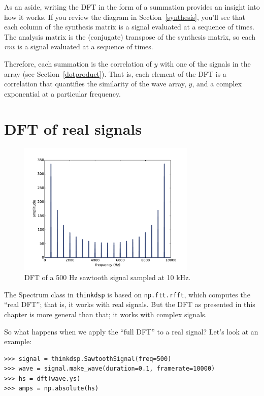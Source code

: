 \documentclass[12pt]{book}
\begin{document}
As an aside, writing the DFT in the form of a summation provides an
insight into how it works.  If you review the diagram in
Section~\ref{synthesis}, you'll see that each column of the synthesis matrix
is a signal evaluated at a sequence of times.  The analysis matrix is
the (conjugate) transpose of the synthesis matrix, so each {\em row}
is a signal evaluated at a sequence of times.

Therefore, each summation is the correlation of $y$ with one of the
signals in the array (see Section~\ref{dotproduct}).  That is, each
element of the DFT is a correlation that quantifies the similarity of
the wave array, $y$, and a complex exponential at a particular
frequency.


\section{DFT of real signals}

\begin{figure}
\centerline{\includegraphics[height=2.5in]{figs/dft3.pdf}}
\caption{DFT of a 500 Hz sawtooth signal sampled at 10 kHz.}
\label{fig.dft3}
\end{figure}

The Spectrum class in {\tt thinkdsp} is based on {\tt np.ftt.rfft},
which computes the ``real DFT''; that is, it works with real signals.
But the DFT as presented in this chapter is more general than that; it
works with complex signals.

So what happens when we apply the ``full DFT'' to a real signal?
Let's look at an example:

\begin{verbatim}
>>> signal = thinkdsp.SawtoothSignal(freq=500)
>>> wave = signal.make_wave(duration=0.1, framerate=10000)
>>> hs = dft(wave.ys)
>>> amps = np.absolute(hs)
\end{verbatim}
\end{document}

